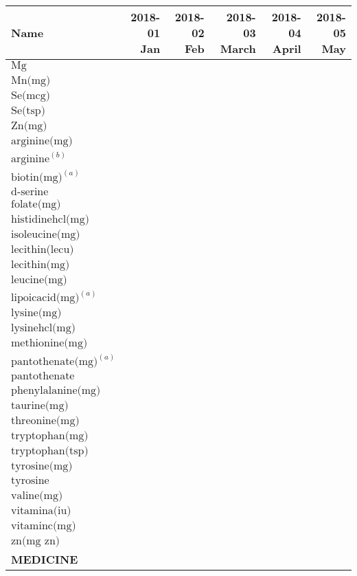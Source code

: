 \begin{table}[H]
\centering
\begin{tabular}{|l|r|r|r|r|r|}
\hline
Name&2018-01 Jan&2018-02 Feb&2018-03 March&2018-04 April&2018-05 May\\
\hline
$\textrm{Mg}$&&&&&\\
$\textrm{Mn(mg)}$&&&&&\\
$\textrm{Se(mcg)}$&&&&&\\
$\textrm{Se(tsp)}$&&&&&\\
$\textrm{Zn(mg)}$&&&&&\\
$\textrm{arginine(mg)}$&&&&&\\
$\textrm{arginine}^{\left(b\right)}$&&&&&\\
$\textrm{biotin(mg)}^{\left(a\right)}$&&&&&\\
$\textrm{d-serine}$&&&&&\\
$\textrm{folate(mg)}$&&&&&\\
$\textrm{histidinehcl(mg)}$&&&&&\\
$\textrm{isoleucine(mg)}$&&&&&\\
$\textrm{lecithin(lecu)}$&&&&&\\
$\textrm{lecithin(mg)}$&&&&&\\
$\textrm{leucine(mg)}$&&&&&\\
$\textrm{lipoicacid(mg)}^{\left(a\right)}$&&&&&\\
$\textrm{lysine(mg)}$&&&&&\\
$\textrm{lysinehcl(mg)}$&&&&&\\
$\textrm{methionine(mg)}$&&&&&\\
$\textrm{pantothenate(mg)}^{\left(a\right)}$&&&&&\\
$\textrm{pantothenate}$&&&&&\\
$\textrm{phenylalanine(mg)}$&&&&&\\
$\textrm{taurine(mg)}$&&&&&\\
$\textrm{threonine(mg)}$&&&&&\\
$\textrm{tryptophan(mg)}$&&&&&\\
$\textrm{tryptophan(tsp)}$&&&&&\\
$\textrm{tyrosine(mg)}$&&&&&\\
$\textrm{tyrosine}$&&&&&\\
$\textrm{valine(mg)}$&&&&&\\
$\textrm{vitamina(iu)}$&&&&&\\
$\textrm{vitaminc(mg)}$&&&&&\\
$\textrm{zn(mg~zn)}$&&&&&\\
{\bf MEDICINE}&&&&&\\

\end{tabular}
\end{table}
